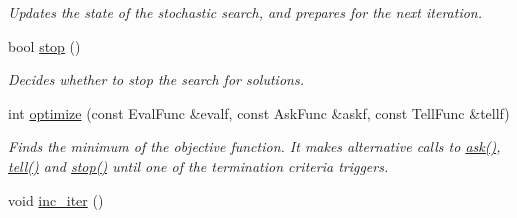 \begin{DoxyCompactItemize}
\begin{DoxyCompactList}\small\item\em Updates the state of the stochastic search, and prepares for the next iteration. \end{DoxyCompactList}\item 
bool \hyperlink{classlibcmaes_1_1ESOStrategy_aa99c52d17342902cc4dc9a863deb58e3}{stop} ()
\begin{DoxyCompactList}\small\item\em Decides whether to stop the search for solutions. \end{DoxyCompactList}\item 
int \hyperlink{classlibcmaes_1_1ESOStrategy_ab56253c2d7753bf42c11b20a0b543b8d}{optimize} (const Eval\+Func \&evalf, const Ask\+Func \&askf, const Tell\+Func \&tellf)
\begin{DoxyCompactList}\small\item\em Finds the minimum of the objective function. It makes alternative calls to \hyperlink{classlibcmaes_1_1ESOStrategy_af614d71ca3e8353b3027723220c9e3b4}{ask()}, \hyperlink{classlibcmaes_1_1ESOStrategy_ad35926877abdaed3922b316f57723612}{tell()} and \hyperlink{classlibcmaes_1_1ESOStrategy_aa99c52d17342902cc4dc9a863deb58e3}{stop()} until one of the termination criteria triggers. \end{DoxyCompactList}\item 
\hypertarget{classlibcmaes_1_1ESOStrategy_a8eda694f97058ca603f8f31e5bb1bc05}{void \hyperlink{classlibcmaes_1_1ESOStrategy_a8eda694f97058ca603f8f31e5bb1bc05}{inc\+\_\+iter} ()}\label{classlibcmaes_1_1ESOStrategy_a8eda694f97058ca603f8f31e5bb1bc05}


\end{DoxyCompactItemize}

